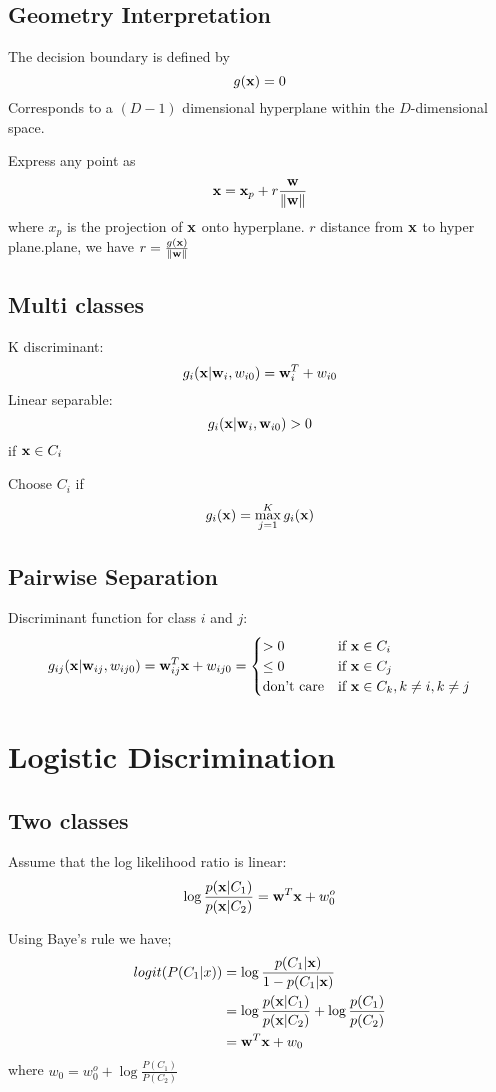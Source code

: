 \subsection{Geometry Interpretation}
The decision boundary is defined by 
\[ g(\mathbf{x}) = 0\]
Corresponds to a $(D-1)$ dimensional hyperplane within the $D$-dimensional
space.

    Express any point as 
    \[\mathbf{x} = \mathbf{x}_p  + r\frac{\mathbf{w}}{\|\mathbf{w}\|}\]
    where $x_p$ is the  projection of $\mathbf{x}$ onto hyperplane. $r$ distance
    from $\mathbf{x}$ to hyper plane.plane, we have $r=\frac{g(\mathbf{x})}{\|\mathbf{w}\|}$
\subsection{Multi classes} 
K discriminant:
\[g_i(\mathbf{x} |\mathbf{w}_i, w_{i0}) = \mathbf{w}_i^T + w_{i0}\]
Linear separable: \[g_i(\mathbf{x}|\mathbf{w}_i, \mathbf{w}_{i0}) > 0\] if $\mathbf{x} \in
        C_i$
        
        Choose $C_i$ if \[g_i(\mathbf{x}) = \max_{j=1}^Kg_i(\mathbf{x})\]

\subsection{Pairwise Separation} 
    Discriminant function for class $i$ and $j$:
        \[
            g_{ij} (\mathbf{x}|\mathbf{w}_{ij}, w_{ij0}) = \mathbf{w}_{ij}^T\mathbf{x} + w_{ij0} =
            \begin{cases}
                > 0 & \mbox{if } \mathbf{x} \in C_i\\
                \leq 0 & \mbox{if } \mathbf{x} \in C_j\\
                \mbox{don't care} & \mbox{if } \mathbf{x} \in C_k, k\neq i, k\neq j
            \end{cases} \]
\section{Logistic Discrimination}
\subsection{Two classes}
     Assume that the log likelihood ratio is linear:
        \[\log\frac{p(\mathbf{x}|C_1)}{p(\mathbf{x}|C_2)} = \mathbf{w}^T\mathbf{x} + w_0^o \]

    Using Baye's rule we have;
        \begin{align*}
            logit(P(C_1|x)) & = \log\frac{p(C_1|\mathbf{x})}{1 - p(C_1|\mathbf{x})} \\
            & = \log\frac{p(\mathbf{x}|C_1)}{p(\mathbf{x}|C_2)} + \log\frac{p(C_1)}{p(C_2)} \\
            & = \mathbf{w}^T\mathbf{x} + w_0
        \end{align*}
        where $w_0 = w_0^o + \log\frac{P(C_1)}{P(C_2)}$

